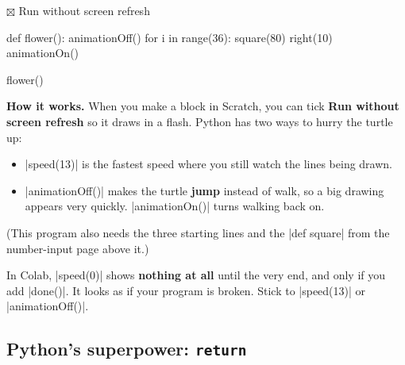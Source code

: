 \begin{tcbraster}[raster columns=2, raster equal height=rows, raster column skip=12pt, raster valign=center, raster force size=false, raster column 1/.style={add to width=-2cm}, raster column 2/.style={add to width=2cm}]
\begin{tcolorbox}[colback=white, colframe=white, boxrule=0pt, valign=center]
\begin{scratch}
\end{scratch}
\par\smallskip
{\small $\boxtimes$ Run without screen refresh}
\end{tcolorbox}
\begin{code}
def flower():
    animationOff()
    for i in range(36):
        square(80)
        right(10)
    animationOn()

flower()
\end{code}
\end{tcbraster}

\textbf{How it works.} When you make a block in Scratch, you can tick \textbf{Run without screen refresh} so it draws in a flash. Python has two ways to hurry the turtle up:
\begin{itemize}
  \item \py|speed(13)| is the fastest speed where you still watch the lines being drawn.
  \item \py|animationOff()| makes the turtle \textbf{jump} instead of walk, so a big drawing appears very quickly. \py|animationOn()| turns walking back on.
\end{itemize}
(This program also needs the three starting lines and the \py|def square| from the number-input page above it.)

\begin{watchout}
In Colab, \py|speed(0)| shows \textbf{nothing at all} until the very end, and only if you add \py|done()|. It looks as if your program is broken. Stick to \py|speed(13)| or \py|animationOff()|.
\end{watchout}

\subsection*{Python's superpower: \texttt{return}}

